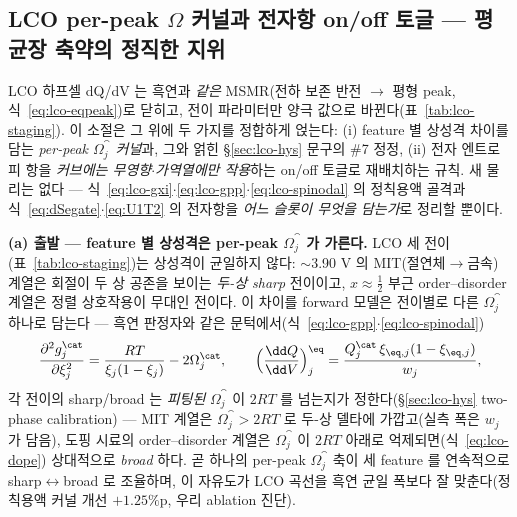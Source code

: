 \subsection{LCO per-peak $\Omega$ 커널과 전자항 on/off 토글 --- 평균장 축약의 정직한 지위}\label{ssec:lco-omega}
LCO 하프셀 dQ/dV 는 흑연과 \emph{같은} MSMR(전하 보존 반전 $\to$ 평형 peak, 식~\eqref{eq:lco-eqpeak})로 닫히고,
전이 파라미터만 양극 값으로 바뀐다(표~\ref{tab:lco-staging}). 이 소절은 그 위에 두 가지를 정합하게 얹는다:
(i) feature 별 상성격 차이를 담는 \emph{per-peak $\Omega_j^\cat$ 커널}과, 그와 얽힌 \S\ref{sec:lco-hys} 문구의
\#7 정정, (ii) 전자 엔트로피 항을 \emph{커브에는 무영향$\cdot$가역열에만 작용}하는 on/off 토글로 재배치하는 규칙.
새 물리는 없다 --- 식~\eqref{eq:lco-gxi}$\cdot$\eqref{eq:lco-gpp}$\cdot$\eqref{eq:lco-spinodal} 의 정칙용액 골격과
식~\eqref{eq:dSegate}$\cdot$\eqref{eq:U1T2} 의 전자항을 \emph{어느 슬롯이 무엇을 담는가}로 정리할 뿐이다.

\textbf{(a) 출발 --- feature 별 상성격은 per-peak $\Omega_j^\cat$ 가 가른다.} LCO 세 전이(표~\ref{tab:lco-staging})는
상성격이 균일하지 않다: $\sim$3.90 V 의 MIT(절연체$\to$금속) 계열은 회절이 두 상 공존을 보이는 \emph{두-상 sharp}
전이이고\cite{reimers1992,menetrier1999}, $x\approx\tfrac12$ 부근 order--disorder 계열은 정렬 상호작용이 무대인
전이다\cite{vanderven1998}. 이 차이를 forward 모델은 전이별로 다른 $\Omega_j^\cat$ 하나로 담는다 --- 흑연
판정자와 같은 문턱에서(식~\eqref{eq:lco-gpp}$\cdot$\eqref{eq:lco-spinodal})
\begin{equation}
\frac{\partial^2 g_j^\cat}{\partial\xi_j^2}=\frac{RT}{\xi_j(1-\xi_j)}-2\Omega_j^\cat,
\qquad
\Big(\frac{\dd Q}{\dd V}\Big)^\eq_j=\frac{Q_j^\cat\,\xi_{\eq,j}(1-\xi_{\eq,j})}{w_j},
\label{eq:lcoomega-kernel}
\end{equation}
각 전이의 sharp/broad 는 \emph{피팅된} $\Omega_j^\cat$ 이 $2RT$ 를 넘는지가 정한다(\S\ref{sec:lco-hys}
two-phase calibration) --- MIT 계열은 $\Omega_j^\cat>2RT$ 로 두-상 델타에 가깝고(실측 폭은 $w_j$ 가 담음), 도핑
시료의 order--disorder 계열은 $\Omega_j^\cat$ 이 $2RT$ 아래로 억제되면(식~\eqref{eq:lco-dope}) 상대적으로
\emph{broad} 하다. 곧 하나의 per-peak $\Omega_j^\cat$ 축이 세 feature 를 연속적으로 sharp$\leftrightarrow$broad
로 조율하며, 이 자유도가 LCO 곡선을 흑연 균일 폭보다 잘 맞춘다(정칙용액 커널 개선 $+1.25\%$p, 우리 ablation 진단).

